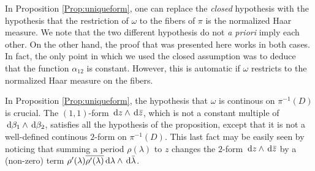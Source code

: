 \documentclass[a4paper,12pt]{article}
\theoremstyle{remark}
\begin{document}
\begin{remark}\label{Rmk:hypothesis}
	In Proposition \ref{Prop:uniqueform}, one can replace the \textit{closed} hypothesis with the hypothesis that the restriction of $\omega$ to the fibers of $\pi$ is the normalized Haar measure. We note that the two different hypothesis do not \textit{a priori} imply each other. On the other hand, the proof that was presented here works in both cases. In fact, the only point in which we used the closed assumption was to deduce that the function $\alpha_{12}$ is constant. However, this is automatic if $\omega$ restricts to the normalized Haar measure on the fibers.
\end{remark}

\begin{remark}
	In Proposition \ref{Prop:uniqueform}, the hypothesis that $\omega$ is continous on $\pi^{-1}(D)$ is crucial. The $(1,1)$-form $\,\mathrm d z \wedge \,\mathrm d \bar{z}$, which is not a constant multiple of $\,\mathrm d \beta_1 \wedge \,\mathrm d \beta_2$, satisfies all the hypothesis of the proposition, except that it is not a well-defined continous $2$-form on $\pi^{-1}(D)$. This last fact may be easily seen by noticing that summing a period $\rho(\lambda)$ to $z$ changes the $2$-form $\,\mathrm d z \wedge \,\mathrm d \bar{z}$ by a (non-zero) term $\rho'(\lambda)\overline{\rho'(\lambda)}\,\mathrm d \lambda \wedge \,\mathrm d \bar{\lambda}$. 
\end{remark}
\end{document}
